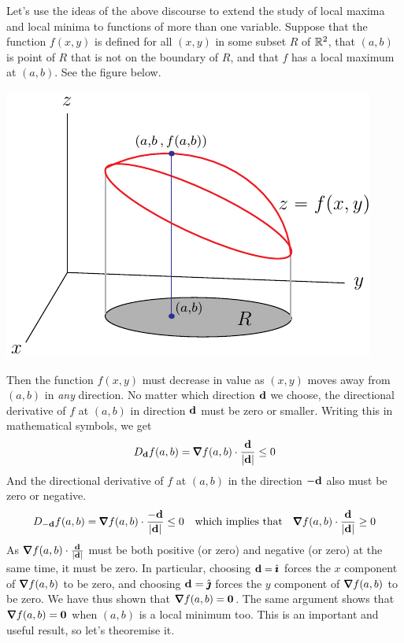 Let's use the ideas of the above discourse to extend the study of
local maxima and local minima to functions of more than one variable.
Suppose that the function $f(x,y)$ is defined for all $(x,y)$ in some
subset $R$ of $\mathbb{R}^2$, that $(a,b)$ is point of $R$ that is not on the boundary of $R$, and that $f$ has a local maximum at $(a,b)$.
See the figure below.
\begin{efig}
\begin{center}
   \includegraphics{max.pdf}
\end{center}
\end{efig}
Then the function $f(x,y)$ must decrease in value as $(x,y)$ moves away from $(a,b)$ in \emph{any} direction. No matter which direction $\mathbf{d}$ we choose,
the directional derivative of $f$ at $(a,b)$ in direction $\mathbf{d}$ 
must be zero or smaller. Writing this in mathematical symbols, we get
\begin{align*}
D_\vd f(a,b) = \vnabla f(a,b)\cdot\frac{\vd}{|\vd|}\le 0
\end{align*}
And the directional derivative of $f$ at $(a,b)$ in the direction $-\mathbf{d}$ 
also must be zero or negative.
\begin{align*}
D_{-\vd} f(a,b) = \vnabla f(a,b)\cdot\frac{-\vd}{|\vd|}\le 0
\quad\text{which implies that}\quad \vnabla f(a,b)\cdot\frac{\vd}{|\vd|}\ge 0
\end{align*}
As $\vnabla f(a,b)\cdot\frac{\vd}{|\vd|}$ must be both positive (or zero)
and negative (or zero) at the same time, it must be zero. 
In particular, choosing $\mathbf{d}=\hat{\pmb{\imath}}$ forces the $x$ component of 
$\vnabla f(a,b)$ to be zero, and  choosing 
$\mathbf{d}=\hat{\pmb{\jmath}}$ forces the $y$ component of $\vnabla f(a,b)$ to be zero.
We have thus shown that  $\vnabla f(a,b)=\vZero$. The same argument
shows that $\vnabla f(a,b)=\vZero$ when $(a,b)$ is a local minimum too.
This is an important and useful result, so let's theoremise it.

